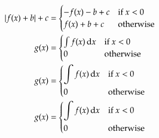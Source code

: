 \begin{align}
    |f(x) + b| + c & =  \begin{cases}
                            -f(x) - b + c & \textrm{if } x < 0 \\
                            f(x) + b + c & \textrm{otherwise}
                        \end{cases} \label{e:abs}\\
    g(x) & =    \begin{cases}
                    \int f(x)\,\mathrm{d}x & \textrm{if } x < 0\\
                    0 & \textrm{otherwise}
                \end{cases} \label{e:case} \\
    g(x) & =    \begin{dcases}
                    \int f(x)\,\mathrm{d}x & \textrm{if } x < 0\\
                    0 & \textrm{otherwise}
                \end{dcases} \label{e:dcases} \\
    g(x) & =    \begin{dcases*}
                    \int f(x)\,\mathrm{d}x & if $x < 0$\\
                    0 & otherwise
                \end{dcases*} \label{e:dcases*}
\end{align}
%
